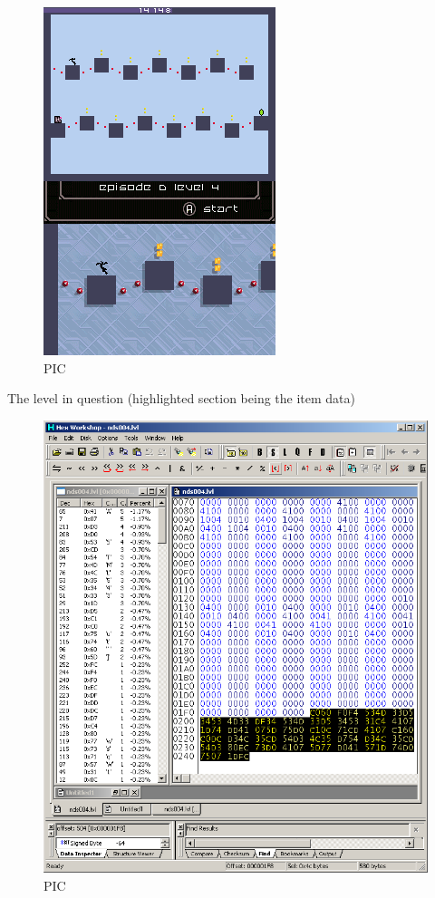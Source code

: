 \documentclass[
]{book}
\begin{document}
\begin{figure}
\centering
\includegraphics{images/179_home_fast6191_romhackingguide_unrenamed_fil___rs_romhackingguideleveleditingworkedNplus12.png}
\caption{PIC}
\end{figure}

The level in question (highlighted section being the item data)

\begin{figure}
\centering
\includegraphics{images/180_home_fast6191_romhackingguide_unrenamed_fil___rs_romhackingguideleveleditingworkedNplus13.png}
\caption{PIC}
\end{figure}
\end{document}

